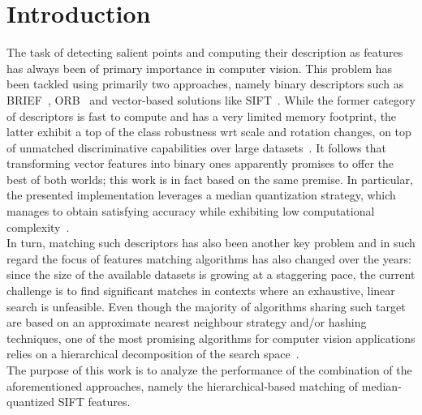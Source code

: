\documentclass[a4paper, 11pt, oneside]{article}
\begin{document}
\section*{Introduction}
  The task of detecting salient points and computing their description as features has always been of primary importance in computer vision. This problem has been tackled using primarily two approaches, namely binary descriptors such as BRIEF~\cite{calonder2010brief}, ORB~\cite{rublee2011orb} and vector-based solutions like SIFT~\cite{lowe2004distinctive}. While the former category of descriptors is fast to compute and has a very limited memory footprint, the latter exhibit a top of the class robustness wrt scale and rotation changes, on top of unmatched discriminative capabilities over large datasets~\cite{grauman2005efficient, karami2017image}. It follows that transforming vector features into binary ones apparently promises to offer the best of both worlds; this work is in fact based on the same premise. In particular, the presented implementation leverages a median quantization strategy, which manages to obtain satisfying accuracy while exhibiting low computational complexity~\cite{peker2011binary}.\\
  In turn, matching such descriptors has also been another key problem and in such regard the focus of features matching algorithms has also changed over the years: since the size of the available datasets is growing at a staggering pace, the current challenge is to find significant matches in contexts where an exhaustive, linear search is unfeasible. Even though the majority of algorithms sharing such target are based on an approximate nearest neighbour strategy and/or hashing techniques, one of the most promising algorithms for computer vision applications relies on a hierarchical decomposition of the search space~\cite{muja2012fast}. \\
  The purpose of this work is to analyze the performance of the combination of the aforementioned approaches, namely the hierarchical-based matching of median-quantized SIFT features.
\end{document}
